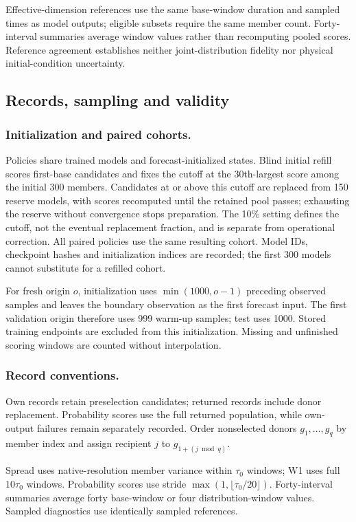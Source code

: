 \documentclass[gmd,manuscript]{copernicus}
\begin{document}
Effective-dimension references use the same base-window duration and sampled times as model outputs; eligible subsets require the same member count. Forty-interval summaries average window values rather than recomputing pooled scores. Reference agreement establishes neither joint-distribution fidelity nor physical initial-condition uncertainty.

\subsection{Records, sampling and validity}\label{app:note3}
\subsubsection{Initialization and paired cohorts.}
Policies share trained models and forecast-initialized states. Blind initial refill scores first-base candidates and fixes the cutoff at the 30th-largest score among the initial 300 members. Candidates at or above this cutoff are replaced from 150 reserve models, with scores recomputed until the retained pool passes; exhausting the reserve without convergence stops preparation. The 10\% setting defines the cutoff, not the eventual replacement fraction, and is separate from operational correction. All paired policies use the same resulting cohort. Model IDs, checkpoint hashes and initialization indices are recorded; the first 300 models cannot substitute for a refilled cohort.

For fresh origin $o$, initialization uses $\min(1000,o-1)$ preceding observed samples and leaves the boundary observation as the first forecast input. The first validation origin therefore uses 999 warm-up samples; test uses 1000. Stored training endpoints are excluded from this initialization. Missing and unfinished scoring windows are counted without interpolation. 

\subsubsection{Record conventions.}

Own records retain preselection candidates; returned records include donor replacement. Probability scores use the full returned population, while own-output failures remain separately recorded. Order nonselected donors $g_1,\ldots,g_q$ by member index and assign recipient $j$ to $g_{1+(j\bmod q)}$.

Spread uses native-resolution member variance within $\tau_0$ windows; W1 uses full $10\tau_0$ windows. Probability scores use stride $\max(1,\lfloor\tau_0/20\rfloor)$. Forty-interval summaries average forty base-window or four distribution-window values. Sampled diagnostics use identically sampled references.
\end{document}
